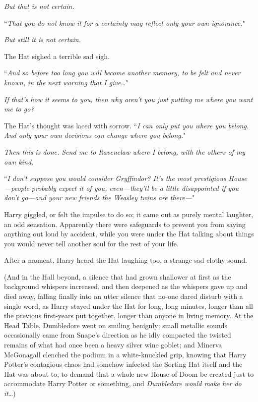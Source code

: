 \emph{But that is not certain.}

``\emph{That \emph{you} do not \emph{know} it for a certainty may reflect only \emph{your} own ignorance.}"

\emph{But still it is not certain.}

The Hat sighed a terrible sad sigh.

``\emph{And so before too long you will become another memory, to be felt and never known, in the next warning that I give{\ldots}}"

\emph{If that's how it seems to you, then why aren't you just \emph{putting} me where you want me to go?}

The Hat's thought was laced with sorrow. ``\emph{I can only put you where you belong. And only your own decisions can change where you belong.}"

\emph{Then this is done. Send me to Ravenclaw where I belong, with the others of my own kind.}

``\emph{I don't suppose you would consider Gryffindor? It's the most prestigious House—people probably expect it of you, even—they'll be a little disappointed if you don't go—and your new friends the Weasley twins are there—}"

Harry giggled, or felt the impulse to do so; it came out as purely mental laughter, an odd sensation. Apparently there were safeguards to prevent you from saying anything out loud by accident, while you were under the Hat talking about things you would never tell another soul for the rest of your life.

After a moment, Harry heard the Hat laughing too, a strange sad clothy sound.

(And in the Hall beyond, a silence that had grown shallower at first as the background whispers increased, and then deepened as the whispers gave up and died away, falling finally into an utter silence that no-one dared disturb with a single word, as Harry stayed under the Hat for long, long minutes, longer than all the previous first-years put together, longer than anyone in living memory. At the Head Table, Dumbledore went on smiling benignly; small metallic sounds occasionally came from Snape's direction as he idly compacted the twisted remains of what had once been a heavy silver wine goblet; and Minerva McGonagall clenched the podium in a white-knuckled grip, knowing that Harry Potter's contagious chaos had somehow infected the Sorting Hat itself and the Hat was about to, to demand that a whole new House of Doom be created just to accommodate Harry Potter or something, and \emph{Dumbledore would make her do it}{\ldots})

